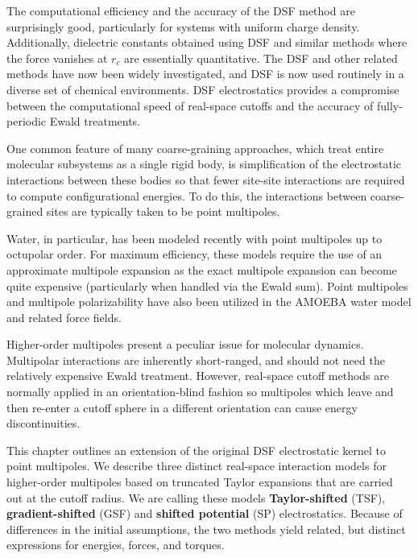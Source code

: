The computational efficiency and the accuracy of the DSF method are
surprisingly good, particularly for systems with uniform charge
density. Additionally, dielectric constants obtained using DSF and
similar methods where the force vanishes at $r_{c}$ are
essentially quantitative.\cite{Izvekov08} The DSF and other
related methods have now been widely investigated,\cite{Hansen12}
and DSF is now used routinely in a diverse set of chemical
environments.\cite{Shi13,McCann13,Kannam13,Forrest12,English08,Louden13,Tokumasu13}
DSF electrostatics provides a compromise between the computational
speed of real-space cutoffs and the accuracy of fully-periodic Ewald
treatments.

One common feature of many coarse-graining approaches, which treat
entire molecular subsystems as a single rigid body, is simplification
of the electrostatic interactions between these bodies so that fewer
site-site interactions are required to compute configurational
energies. To do this, the interactions between coarse-grained sites
are typically taken to be point
multipoles.\cite{Golubkov06,Orsi10,Orsi11}

Water, in particular, has been modeled recently with point multipoles
up to octupolar
order.\cite{Chowdhuri06,Te10rt,Te10ys,Te10vn} For
maximum efficiency, these models require the use of an approximate
multipole expansion as the exact multipole expansion can become quite
expensive (particularly when handled via the Ewald
sum).\cite{Ichiye06} Point multipoles and multipole
polarizability have also been utilized in the AMOEBA water model and
related force fields.\cite{Ponder10,schnieders07,Ren11}

Higher-order multipoles present a peculiar issue for molecular
dynamics. Multipolar interactions are inherently short-ranged, and
should not need the relatively expensive Ewald treatment.  However,
real-space cutoff methods are normally applied in an orientation-blind
fashion so multipoles which leave and then re-enter a cutoff sphere in
a different orientation can cause energy discontinuities.

This chapter outlines an extension of the original DSF electrostatic
kernel to point multipoles.  We describe three distinct real-space
interaction models for higher-order multipoles based on truncated
Taylor expansions that are carried out at the cutoff radius.  We are
calling these models {\bf Taylor-shifted} (TSF), {\bf
  gradient-shifted} (GSF) and {\bf shifted potential} (SP)
electrostatics.  Because of differences in the initial assumptions,
the two methods yield related, but distinct expressions for energies,
forces, and torques.

